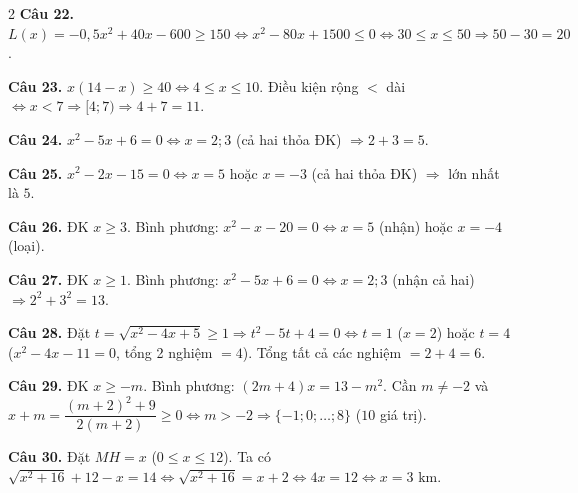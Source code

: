 \documentclass[12pt,a4paper]{article}
\begin{document}
\begin{multicols}{2}
\textbf{Câu 22.} $L(x) = -0{,}5x^2 + 40x - 600 \ge 150 \Leftrightarrow x^2 - 80x + 1500 \le 0 \Leftrightarrow 30 \le x \le 50 \Rightarrow 50 - 30 = 20$.

\textbf{Câu 23.} $x(14 - x) \ge 40 \Leftrightarrow 4 \le x \le 10$. Điều kiện rộng $<$ dài $\Leftrightarrow x < 7 \Rightarrow [4; 7) \Rightarrow 4 + 7 = 11$.

\textbf{Câu 24.} $x^2 - 5x + 6 = 0 \Leftrightarrow x = 2; 3$ (cả hai thỏa ĐK) $\Rightarrow 2 + 3 = 5$.

\textbf{Câu 25.} $x^2 - 2x - 15 = 0 \Leftrightarrow x = 5$ hoặc $x = -3$ (cả hai thỏa ĐK) $\Rightarrow$ lớn nhất là $5$.

\textbf{Câu 26.} ĐK $x \ge 3$. Bình phương: $x^2 - x - 20 = 0 \Leftrightarrow x = 5$ (nhận) hoặc $x = -4$ (loại).

\textbf{Câu 27.} ĐK $x \ge 1$. Bình phương: $x^2 - 5x + 6 = 0 \Leftrightarrow x = 2; 3$ (nhận cả hai) $\Rightarrow 2^2 + 3^2 = 13$.

\textbf{Câu 28.} Đặt $t = \sqrt{x^2 - 4x + 5} \ge 1 \Rightarrow t^2 - 5t + 4 = 0 \Leftrightarrow t = 1$ ($x=2$) hoặc $t = 4$ ($x^2 - 4x - 11 = 0$, tổng 2 nghiệm $= 4$). Tổng tất cả các nghiệm $= 2 + 4 = 6$.

\textbf{Câu 29.} ĐK $x \ge -m$. Bình phương: $(2m + 4)x = 13 - m^2$. Cần $m \ne -2$ và $x + m = \dfrac{(m+2)^2 + 9}{2(m+2)} \ge 0 \Leftrightarrow m > -2 \Rightarrow \{-1; 0; \dots; 8\}$ ($10$ giá trị).

\textbf{Câu 30.} Đặt $MH = x$ ($0 \le x \le 12$). Ta có $\sqrt{x^2 + 16} + 12 - x = 14 \Leftrightarrow \sqrt{x^2 + 16} = x + 2 \Leftrightarrow 4x = 12 \Leftrightarrow x = 3\text{ km}$.

\end{multicols}
\end{document}
